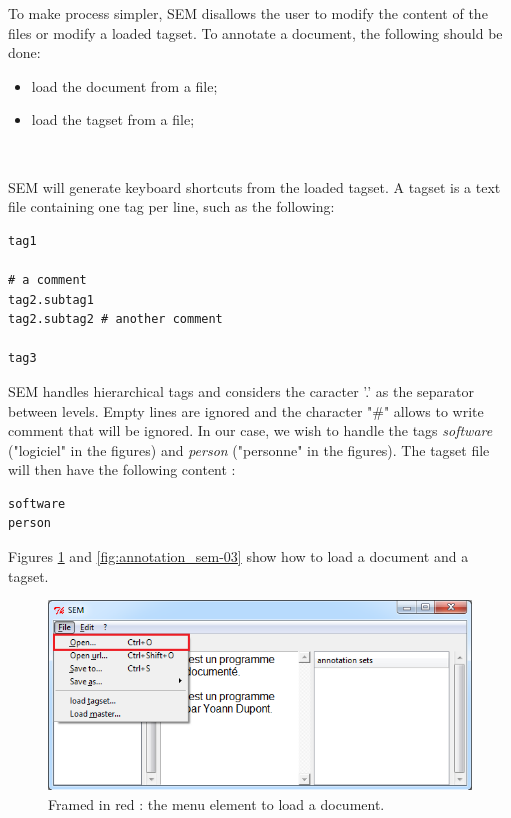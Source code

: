 \documentclass[manual-fr.tex]{subfiles}
\begin{document}
To make process simpler, SEM disallows the user to modify the content of the files or modify a loaded tagset. To annotate a document, the following should be done:
\begin{itemize}
    \item load the document from a file;
    \item load the tagset from a file;
\end{itemize}

~

SEM will generate keyboard shortcuts from the loaded tagset. A tagset is a text file containing one tag per line, such as the following:

\begin{lstlisting}[frame=single]
tag1

# a comment
tag2.subtag1
tag2.subtag2 # another comment

tag3
\end{lstlisting}

SEM handles hierarchical tags and considers the caracter '.' as the separator between levels. Empty lines are ignored and the character "\#" allows to write comment that will be ignored. In our case, we wish to handle the tags \emph{software} ("logiciel" in the figures) and \emph{person} ("personne" in the figures). The tagset file will then have the following content :

\begin{lstlisting}[frame=single]
software
person
\end{lstlisting}

Figures \ref{fig:annotation_sem-02} and \ref{fig:annotation_sem-03} show how to load a document and a tagset.

\begin{figure}[ht!]
    \begin{center}
    \includegraphics[scale=0.5]{fr/images/annotation_sem-02.png}
    \end{center}
    \caption{Framed in red : the menu element to load a document.}
    \label{fig:annotation_sem-02}
\end{figure}
\end{document}
